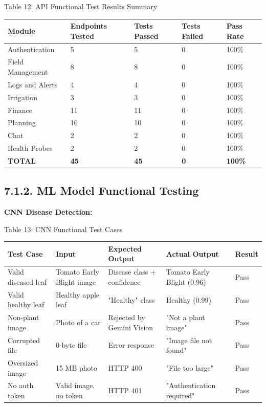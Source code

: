 \documentclass[12pt, a4paper]{report}
\begin{document}
Table 12: API Functional Test Results Summary

\begin{table}[htbp]
\centering
\small
\begin{tabularx}{\textwidth}{|X|X|X|X|X|}
\hline
Module & Endpoints Tested & Tests Passed & Tests Failed & Pass Rate \\
\hline
Authentication & 5 & 5 & 0 & 100\% \\
Field Management & 8 & 8 & 0 & 100\% \\
Logs and Alerts & 4 & 4 & 0 & 100\% \\
Irrigation & 3 & 3 & 0 & 100\% \\
Finance & 11 & 11 & 0 & 100\% \\
Planning & 10 & 10 & 0 & 100\% \\
Chat & 2 & 2 & 0 & 100\% \\
Health Probes & 2 & 2 & 0 & 100\% \\
\textbf{TOTAL} & \textbf{45} & \textbf{45} & \textbf{0} & \textbf{100\%} \\
\hline
\end{tabularx}
\end{table}

\subsection{7.1.2. ML Model Functional Testing}
\textbf{CNN Disease Detection:}

Table 13: CNN Functional Test Cases

\begin{table}[htbp]
\centering
\small
\begin{tabularx}{\textwidth}{|X|X|X|X|X|}
\hline
Test Case & Input & Expected Output & Actual Output & Result \\
\hline
Valid diseased leaf & Tomato Early Blight image & Disease class + confidence & Tomato Early Blight (0.96) & Pass \\
Valid healthy leaf & Healthy apple leaf & "Healthy" class & Healthy (0.99) & Pass \\
Non-plant image & Photo of a car & Rejected by Gemini Vision & "Not a plant image" & Pass \\
Corrupted file & 0-byte file & Error response & "Image file not found" & Pass \\
Oversized image & 15 MB photo & HTTP 400 & "File too large" & Pass \\
No auth token & Valid image, no token & HTTP 401 & "Authentication required" & Pass \\
\hline
\end{tabularx}
\end{table}
\end{document}
